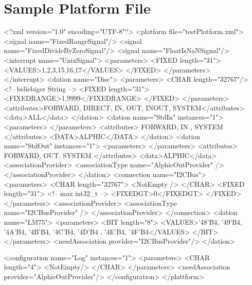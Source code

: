 \section{Sample Platform File}
\begin{XMLCode}
<?xml version="1.0" encoding="UTF-8"?>
<platform file="testPlatform.xml">
      <signal name="FixedRangeSignal"/>
      <signal name="FixedDivideByZeroSignal"/>
      <signal name="FloatIsNaNSignal"/>
      <interrupt name="UnixSignal">
         <parameters>
            <FIXED length="31">
               <VALUES>1,2,3,15,16,17</VALUES>
            </FIXED>
         </parameters>
      </interrupt>
      <dation name="Disc">
         <parameters>
            <CHAR length="32767"/>	<!-- beliebiger String -->
            <FIXED length="31">
               <FIXEDRANGE>1,9999</FIXEDRANGE>
            </FIXED>
         </parameters>
         <attributes>FORWARD, DIRECT, IN, OUT, INOUT, SYSTEM</attributes>
         <data>ALL</data>
      </dation>
      <dation name="StdIn" instances="1">
         <parameters>
         </parameters>
         <attributes>
            FORWARD, IN	, SYSTEM
         </attributes>
         <DATA>ALPHIC</DATA>
      </dation>
      <dation name="StdOut" instances="1">
         <parameters>
         </parameters>
	 <attributes>
            FORWARD, OUT, SYSTEM
         </attributes>
         <data>ALPHIC</data>
         <associationProvider>
            <associationType name="AlphicOutProvider" />
         </associationProvider>
      </dation>
      <connection name="I2CBus">
         <parameters>
            <CHAR length="32767">
               <NotEmpty />
            </CHAR>
            <FIXED length="31">	<!-- max int32_t -->
               <FIXEDGT>0</FIXEDGT>
            </FIXED>
         </parameters>
         <associationProvider>
            <associationType name="I2CBusProvider" />
         </associationProvider>
      </connection>
      <dation name="LM75">
         <parameters>
            <BIT length="8">
               <VALUES>'48'B4, '49'B4, '4A'B4, '4B'B4,
                       '4C'B4, '4D'B4 , '4E'B4, '4F'B4</VALUES>
            </BIT>
         </parameters>
         <needAssociation provider="I2CBusProvider"/>
      </dation>

  <configuration name="Log" instances="1">
    <parameters>
      <CHAR length="4">
         <NotEmpty/>
      </CHAR>
    </parameters>
    <needAssociation provider="AlphicOutProvider"/>
  </configuration>
</plattform>
\end{XMLCode}
